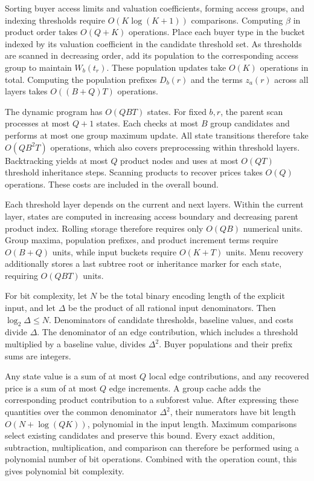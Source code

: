 \begin{IEEEproof}
Sorting buyer access limits and valuation coefficients, forming access groups, and indexing thresholds require $O(K\log(K+1))$ comparisons. Computing $\beta$ in product order takes $O(Q+K)$ operations. Place each buyer type in the bucket indexed by its valuation coefficient in the candidate threshold set. As thresholds are scanned in decreasing order, add its population to the corresponding access group to maintain $W_b(t_r)$. These population updates take $O(K)$ operations in total. Computing the population prefixes $D_b(r)$ and the terms $z_a(r)$ across all layers takes $O((B+Q)T)$ operations.

The dynamic program has $O(QBT)$ states. For fixed $b,r$, the parent scan processes at most $Q+1$ states. Each checks at most $B$ group candidates and performs at most one group maximum update. All state transitions therefore take $O(QB^2T)$ operations, which also covers preprocessing within threshold layers. Backtracking yields at most $Q$ product nodes and uses at most $O(QT)$ threshold inheritance steps. Scanning products to recover prices takes $O(Q)$ operations. These costs are included in the overall bound.

Each threshold layer depends on the current and next layers. Within the current layer, states are computed in increasing access boundary and decreasing parent product index. Rolling storage therefore requires only $O(QB)$ numerical units. Group maxima, population prefixes, and product increment terms require $O(B+Q)$ units, while input buckets require $O(K+T)$ units. Menu recovery additionally stores a last subtree root or inheritance marker for each state, requiring $O(QBT)$ units.

For bit complexity, let $N$ be the total binary encoding length of the explicit input, and let $\Delta$ be the product of all rational input denominators. Then $\log_2\Delta\le N$. Denominators of candidate thresholds, baseline values, and costs divide $\Delta$. The denominator of an edge contribution, which includes a threshold multiplied by a baseline value, divides $\Delta^2$. Buyer populations and their prefix sums are integers.

Any state value is a sum of at most $Q$ local edge contributions, and any recovered price is a sum of at most $Q$ edge increments. A group cache adds the corresponding product contribution to a subforest value. After expressing these quantities over the common denominator $\Delta^2$, their numerators have bit length $O(N+\log(QK))$, polynomial in the input length. Maximum comparisons select existing candidates and preserve this bound. Every exact addition, subtraction, multiplication, and comparison can therefore be performed using a polynomial number of bit operations. Combined with the operation count, this gives polynomial bit complexity.%
\end{IEEEproof}

